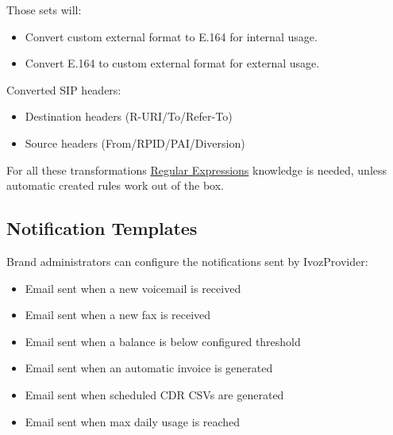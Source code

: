 \documentclass[letterpaper,10pt,english]{sphinxmanual}
\begin{document}
Those sets will:
\begin{itemize}
\item {} 
Convert custom external format to E.164 for internal usage.

\item {} 
Convert E.164 to custom external format for external usage.

\end{itemize}

Converted SIP headers:
\begin{itemize}
\item {} 
Destination headers (R-URI/To/Refer-To)

\item {} 
Source headers (From/RPID/PAI/Diversion)

\end{itemize}

For all these transformations \href{http://php.net/manual/en/reference.pcre.pattern.syntax.php}{Regular Expressions} knowledge
is needed, unless automatic created rules work out of the box.


\subsection{Notification Templates}
\label{administration_portal/brand/settings/notification_templates::doc}\label{administration_portal/brand/settings/notification_templates:notification-templates}\label{administration_portal/brand/settings/notification_templates:id1}
Brand administrators can configure the notifications sent by IvozProvider:
\begin{itemize}
\item {} 
Email sent when a new voicemail is received

\item {} 
Email sent when a new fax is received

\item {} 
Email sent when a balance is below configured threshold

\item {} 
Email sent when an automatic invoice is generated

\item {} 
Email sent when scheduled CDR CSVs are generated

\item {} 
Email sent when max daily usage is reached

\end{itemize}
\end{document}
